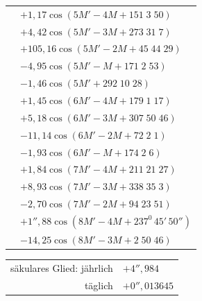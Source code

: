 \begin{longtable}{@{}r@{}l@{}}
&\(+1{,}17\cos(5M'-4M+151\;3\;50)\)\\
&\(+4{,}42\cos(5M'-3M+273\;31\;7)\)\\
&\(+105{,}16\cos(5M'-2M+45\;44\;29)\)\\
&\(-4{,}95\cos(5M'-M+171\;2\;53)\)\\
&\(-1{,}46\cos(5M'+292\;10\;28)\)\\
&\(+1{,}45\cos(6M'-4M+179\;1\;17)\)\\
&\(+5{,}18\cos(6M'-3M+307\;50\;46)\)\\
&\(-11{,}14\cos(6M'-2M+72\;2\;1)\)\\
&\(-1{,}93\cos(6M'-M+174\;2\;6)\)\\
&\(+1{,}84\cos(7M'-4M+211\;21\;27)\)\\
&\(+8{,}93\cos(7M'-3M+338\;35\;3)\)\\
&\(-2{,}70\cos(7M'-2M+94\;23\;51)\)\\
&\(+1''{,}88\cos(8M'-4M+237^0\,45'\,50'')\)\\
&\(-14{,}25\cos(8M'-3M+2\;50\;46)\)
\end{longtable}
\begin{center}
\begin{tabular}{rl}
säkulares Glied: jährlich&\(+4''{,}984\)\\
täglich&\(+0''{,}013645\)
\end{tabular}
\end{center}
